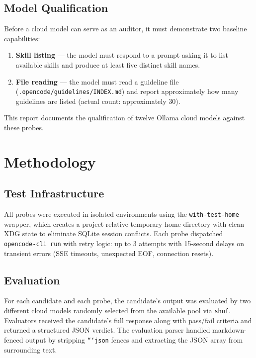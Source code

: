 \documentclass[11pt,a4paper]{article}
\begin{document}
\subsection{Model Qualification}

Before a cloud model can serve as an auditor, it must demonstrate two baseline capabilities:

\begin{enumerate}
  \item \textbf{Skill listing} --- the model must respond to a prompt asking it to list available skills and produce at least five distinct skill names.
  \item \textbf{File reading} --- the model must read a guideline file (\texttt{.opencode/guidelines/INDEX.md}) and report approximately how many guidelines are listed (actual count: approximately 30).
\end{enumerate}

This report documents the qualification of twelve Ollama cloud models against these probes.

\section{Methodology}

\subsection{Test Infrastructure}

All probes were executed in isolated environments using the \texttt{with-test-home} wrapper, which creates a project-relative temporary home directory with clean XDG state to eliminate SQLite session conflicts. Each probe dispatched \texttt{opencode-cli run} with retry logic: up to 3 attempts with 15-second delays on transient errors (SSE timeouts, unexpected EOF, connection resets).

\subsection{Evaluation}

For each candidate and each probe, the candidate's output was evaluated by two different cloud models randomly selected from the available pool via \texttt{shuf}. Evaluators received the candidate's full response along with pass/fail criteria and returned a structured JSON verdict. The evaluation parser handled markdown-fenced output by stripping \texttt{```json} fences and extracting the JSON array from surrounding text.
\end{document}
